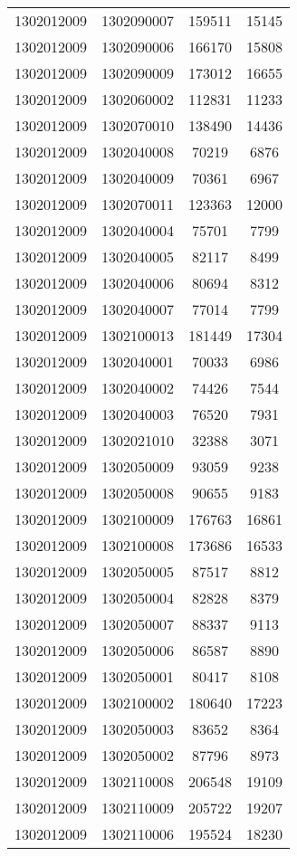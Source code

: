 \begin{longtable}{llcc}
1302012009 & 1302090007 & 159511 & 15145\\
1302012009 & 1302090006 & 166170 & 15808\\
1302012009 & 1302090009 & 173012 & 16655\\
1302012009 & 1302060002 & 112831 & 11233\\
1302012009 & 1302070010 & 138490 & 14436\\
1302012009 & 1302040008 & 70219 & 6876\\
1302012009 & 1302040009 & 70361 & 6967\\
1302012009 & 1302070011 & 123363 & 12000\\
1302012009 & 1302040004 & 75701 & 7799\\
1302012009 & 1302040005 & 82117 & 8499\\
1302012009 & 1302040006 & 80694 & 8312\\
1302012009 & 1302040007 & 77014 & 7799\\
1302012009 & 1302100013 & 181449 & 17304\\
1302012009 & 1302040001 & 70033 & 6986\\
1302012009 & 1302040002 & 74426 & 7544\\
1302012009 & 1302040003 & 76520 & 7931\\
1302012009 & 1302021010 & 32388 & 3071\\
1302012009 & 1302050009 & 93059 & 9238\\
1302012009 & 1302050008 & 90655 & 9183\\
1302012009 & 1302100009 & 176763 & 16861\\
1302012009 & 1302100008 & 173686 & 16533\\
1302012009 & 1302050005 & 87517 & 8812\\
1302012009 & 1302050004 & 82828 & 8379\\
1302012009 & 1302050007 & 88337 & 9113\\
1302012009 & 1302050006 & 86587 & 8890\\
1302012009 & 1302050001 & 80417 & 8108\\
1302012009 & 1302100002 & 180640 & 17223\\
1302012009 & 1302050003 & 83652 & 8364\\
1302012009 & 1302050002 & 87796 & 8973\\
1302012009 & 1302110008 & 206548 & 19109\\
1302012009 & 1302110009 & 205722 & 19207\\
1302012009 & 1302110006 & 195524 & 18230\\

\end{longtable}
